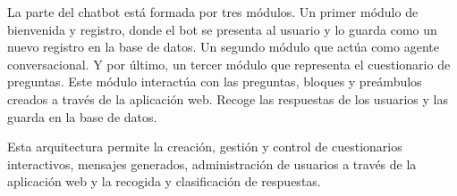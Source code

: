 La parte del chatbot está formada por tres módulos. Un primer módulo de bienvenida y registro, donde el bot se presenta al usuario y lo guarda como un nuevo registro en la base de datos. Un segundo módulo que actúa como agente conversacional. Y por último, un tercer módulo que representa el cuestionario de preguntas. Este módulo interactúa con las preguntas, bloques y preámbulos creados a través de la aplicación web. Recoge las respuestas de los usuarios y las guarda en la base de datos.

Esta arquitectura permite la creación, gestión y control de cuestionarios interactivos, mensajes generados, administración de usuarios a través de la aplicación web y la recogida y clasificación de respuestas. 








